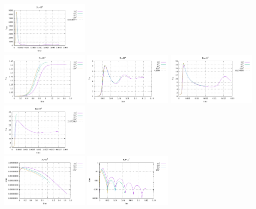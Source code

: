 \begin{center}
\includegraphics[width=4.297cm]{python_codes/fieldstone_155/results/vrms_Ra1e6}\\
\includegraphics[width=4.297cm]{python_codes/fieldstone_155/results/Nu_Ra1e3}
\includegraphics[width=4.297cm]{python_codes/fieldstone_155/results/Nu_Ra1e4}
\includegraphics[width=4.297cm]{python_codes/fieldstone_155/results/Nu_Ra1e5}
\includegraphics[width=4.297cm]{python_codes/fieldstone_155/results/Nu_Ra1e6}
\\
\includegraphics[width=4.297cm]{python_codes/fieldstone_155/results/conv_u_Ra1e3}
\includegraphics[width=4.297cm]{python_codes/fieldstone_155/results/conv_u_Ra1e4}

\end{center}

